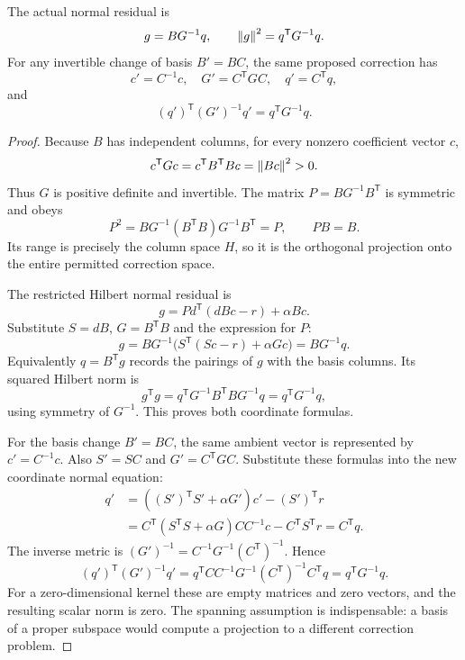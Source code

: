 \begin{proposition}\label{WR15}
The actual normal residual is
\begin{equation}\label{eq:covector-norm}
 g=BG^{-1}q,\qquad \left\lVert g\right\rVert^2=q^{\mathsf T}G^{-1}q.
\end{equation}
For any invertible change of basis $B'=BC$, the same proposed correction has
\[
 c'=C^{-1}c,\quad G'=C^{\mathsf T}GC,\quad q'=C^{\mathsf T}q,
\]
and
\[
 (q')^{\mathsf T}(G')^{-1}q'=q^{\mathsf T}G^{-1}q.
\]
\end{proposition}
\begin{proof}
Because $B$ has independent columns, for every nonzero coefficient vector $c$,
\[
 c^{\mathsf T}Gc=c^{\mathsf T}B^{\mathsf T}Bc=\left\lVert Bc\right\rVert^2>0.
\]
Thus $G$ is positive definite and invertible. The matrix $P=BG^{-1}B^{\mathsf T}$ is symmetric and obeys
\[
 P^2=BG^{-1}(B^{\mathsf T}B)G^{-1}B^{\mathsf T}=P,
 \qquad PB=B.
\]
Its range is precisely the column space $H$, so it is the orthogonal projection onto the entire permitted correction space.

The restricted Hilbert normal residual is
\[
 g=P d^{\mathsf T}(dBc-r)+\alpha Bc.
\]
Substitute $S=dB$, $G=B^{\mathsf T}B$ and the expression for $P$:
\[
 g=BG^{-1}\bigl(S^{\mathsf T}(Sc-r)+\alpha Gc\bigr)=BG^{-1}q.
\]
Equivalently $q=B^{\mathsf T}g$ records the pairings of $g$ with the basis columns. Its squared Hilbert norm is
\[
 g^{\mathsf T}g
 =q^{\mathsf T}G^{-1}B^{\mathsf T}BG^{-1}q
 =q^{\mathsf T}G^{-1}q,
\]
using symmetry of $G^{-1}$. This proves both coordinate formulas.

For the basis change $B'=BC$, the same ambient vector is represented by $c'=C^{-1}c$. Also $S'=SC$ and $G'=C^{\mathsf T}GC$. Substitute these formulas into the new coordinate normal equation:
\[
\begin{aligned}
 q'&=((S')^{\mathsf T}S'+\alpha G')c'-(S')^{\mathsf T}r\\
 &=C^{\mathsf T}(S^{\mathsf T}S+\alpha G)CC^{-1}c
      -C^{\mathsf T}S^{\mathsf T}r=C^{\mathsf T}q.
\end{aligned}
\]
The inverse metric is $(G')^{-1}=C^{-1}G^{-1}(C^{\mathsf T})^{-1}$. Hence
\[
 (q')^{\mathsf T}(G')^{-1}q'
 =q^{\mathsf T}C C^{-1}G^{-1}(C^{\mathsf T})^{-1}C^{\mathsf T}q
 =q^{\mathsf T}G^{-1}q.
\]
For a zero-dimensional kernel these are empty matrices and zero vectors, and the resulting scalar norm is zero. The spanning assumption is indispensable: a basis of a proper subspace would compute a projection to a different correction problem.
\end{proof}

